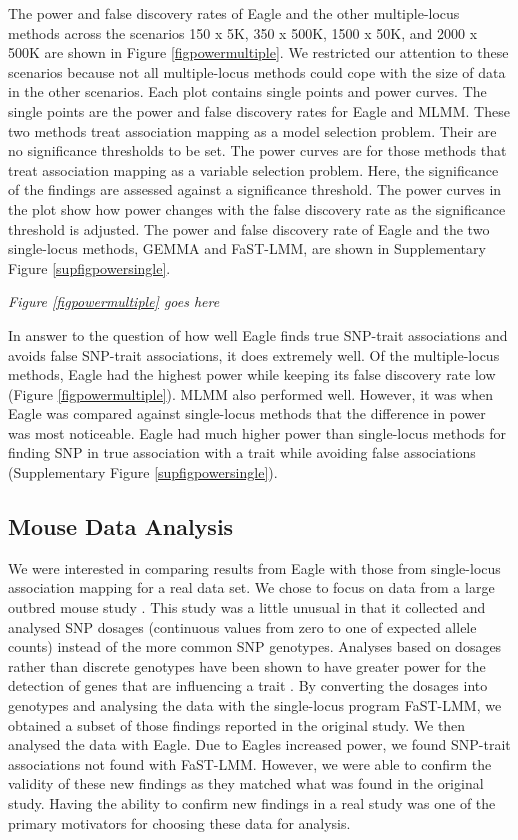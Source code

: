 \documentclass{nature}
\begin{document}
The power and false discovery rates of Eagle and the other multiple-locus methods across the scenarios 150 x 5K, 350 x 500K, 1500 x 50K, and 2000 x 500K are shown in Figure \ref{figpowermultiple}.  We restricted our attention to these scenarios because not all 
multiple-locus methods could cope with the size of data in the other scenarios. 
  Each plot contains 
single points and power curves. The single points are the power and false discovery rates for Eagle and MLMM.
These two methods treat association mapping as a model selection problem. Their are no significance thresholds to be set. 
The power curves are for those methods that treat association mapping as a variable selection problem. Here, the 
significance of the findings are assessed against a significance threshold. The power curves in the plot show how power changes with 
the false discovery rate as the significance threshold  is adjusted. 
The power and false discovery rate of Eagle and the two single-locus methods, GEMMA and FaST-LMM,  are shown in
Supplementary Figure \ref{supfigpowersingle}. 


{\em Figure \ref{figpowermultiple} goes here}


In answer to the question of how well Eagle finds true SNP-trait associations and avoids false SNP-trait associations, it does extremely 
well.  Of the multiple-locus methods, Eagle had the highest power
while keeping its false discovery rate low (Figure \ref{figpowermultiple}). MLMM also performed well. However, it was when Eagle was compared against single-locus methods 
that the difference in power was most noticeable.  Eagle had much higher power than single-locus methods for finding SNP in true 
association with a trait while avoiding false associations (Supplementary Figure \ref{supfigpowersingle}). 




\subsection{Mouse Data Analysis}


We were interested in comparing results from Eagle with those from single-locus association mapping for a real data set.
 We chose to focus on data from a large outbred mouse study \cite{nicod2016genome}. This study was a little unusual in that it collected and analysed SNP dosages (continuous values from zero to one of expected allele counts)  instead of the more common SNP genotypes. Analyses based on dosages rather than discrete genotypes have been shown to have greater power for the detection of genes that are influencing a trait  \cite{zheng2011comparison}. By converting the dosages into genotypes and analysing the data with the single-locus program FaST-LMM, we obtained a subset of those findings reported in the original study. We then analysed the data with Eagle. Due to Eagles increased power, we found SNP-trait associations not found with  FaST-LMM. However, we were 
 able to confirm the validity of these new findings as they matched what was found in the original study. Having the ability to confirm new findings  in a real study was 
 one of the primary motivators for choosing these data for analysis. 
\end{document}
